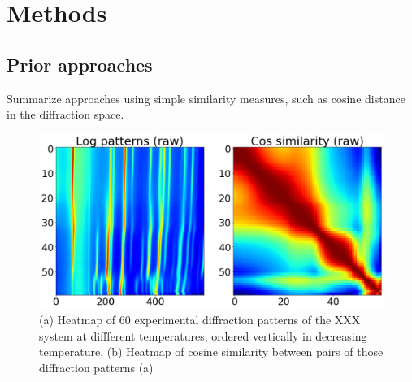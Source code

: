 \documentclass[12pt]{iopart}
\begin{document}
\section{Methods}

\subsection{Prior approaches}
Summarize approaches using simple similarity measures, such as cosine distance in the diffraction space.

\begin{figure}
  \includegraphics[width=\linewidth]{paper_figures/1/raw_with_similarity.png}
  \caption{(a) Heatmap of 60 experimental diffraction patterns of the XXX system at diffferent temperatures, ordered vertically in decreasing temperature. (b) Heatmap of cosine similarity between pairs of those diffraction patterns (a)}
  \label{fig:noise}
\end{figure}
\end{document}
